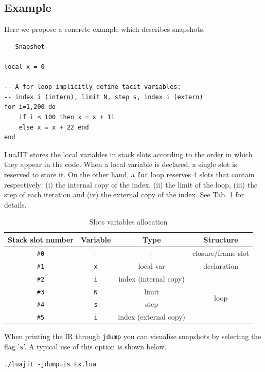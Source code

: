 \subsection{Example}
Here we propose a concrete example which describes snapshots.
\begin{mdframed}[style=LuaStyleFrame]
\begin{lstlisting}[style=LuaStyle]
-- Snapshot

local x = 0

-- A for loop implicitly define tacit variables: 
-- index i (intern), limit N, step s, index i (extern)
for i=1,200 do
	if i < 100 then x = x + 11
	else x = x + 22 end
end
\end{lstlisting}
\end{mdframed}
\noindent
LuaJIT stores the local variables in stack slots according to the order in which they appear in the code. When a local variable is declared, a single slot is reserved to store it. On the other hand, a \texttt{for} loop reserves 4 slots that contain respectively: (i) the internal copy of the index, (ii) the limit of the loop, (iii) the step of each iteration and (iv) the external copy of the index. See Tab. \ref{tab:snap-var-alloc} for details.
\begin{table}[H]
    \centering
    \begin{tabular}{|c|c|c|c|}
        \hline
        Stack slot number & Variable & Type & Structure\\
        \hline
        \texttt{\#0} & - & - & closure/frame slot\\
        \hline
        \texttt{\#1} &  \texttt{x} & local var & declaration\\
        \hline
        \texttt{\#2} & \texttt{i} & index \footnotesize{(internal copy)} & \multirow{4}{*}{loop} \\
        \texttt{\#3} & \texttt{N} & limit & \\
        \texttt{\#4} & \texttt{s} & step & \\
        \texttt{\#5} & \texttt{i} & index \footnotesize{(external copy)} & \\
        \hline
    \end{tabular}
    \caption{Slots variables allocation}
    \label{tab:snap-var-alloc}
\end{table}
\noindent
When printing the IR through \texttt{jdump} you can visualise snapshots by selecting the flag '\texttt{s}'. A typical use of this option is shown below. 
\begin{lstlisting}[style=DumpStyle]
   ./luajit -jdump=is Ex.lua
\end{lstlisting}
